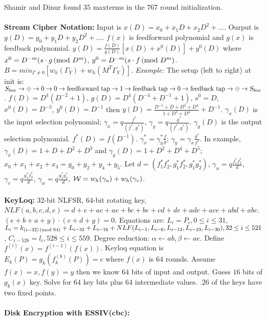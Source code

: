 Shamir and Dinur found $35$ maxterms in the $767$ round initialization.
\\
\\
{\bf Stream Cipher Notation:} 
Input is $x(D)= x_0 + x_1 D + x_2 D^2 + \ldots $.
Ourput is $y(D)= y_0 + y_1 D + y_2 D^2 + \ldots $.
$f(x)$ is feedforward polynomial and $g(x)$ is feedback polynomial.
$y(D)= {\frac {f(D)}{g(D)}} [x(D) + x^0(D)] + y^0(D)$ where
$x^0= D^{-m} (s \cdot g \thinspace \textnormal{(mod } D^m \textnormal{)}$,
$y^0= D^{-m} (s \cdot f \thinspace \textnormal{(mod } D^m \textnormal{)}$.
$B= min_{\Gamma \ne 0} [w_h(\Gamma_Y) + w_h(M^T \Gamma_Y)]$.
\emph{Example:} The setup (left to right) at init is:
$ S_{box} \rightarrow  \oplus \rightarrow
0 \rightarrow 0 \rightarrow \textnormal{feedforward tap} \rightarrow
1 \rightarrow \textnormal{feedback tap} \rightarrow 0 \rightarrow
\textnormal{feedback tap} \rightarrow \oplus \rightarrow S_{box}$.
$f(D)= D^4(D^{-2} + 1)$,
$g(D)= D^4(D^{-4}+ D^{-1} + 1)$, $s^0= D$, $x^0(D)= D^{-3}$,
$y^0(D)= D^{-1}$ then
$y(D)= {\frac {D^{-1}+D+D^2+D^4} {1+D^3+D^4}} + D^{-1}$.
$\gamma_x(D)$ is the input selection polynomial;
$\gamma_x = q {\frac {f^*} {(f^*, g^*)}}$,
$\gamma_y = q {\frac {g^*} {(f^*, g^*)}}$.
$\gamma_y(D)$ is the output selection polynomial. $f^*(D)= f(D^{-1})$.
$\gamma_x^*= \gamma_y^* {\frac {f} {g}}$;
$\gamma_y= \gamma_x {\frac {g^*} {f^*}}$.  In example, 
$\gamma_x(D)= 1 + D + D^2 + D^3$ and
$\gamma_y(D)= 1 + D^2 + D^4 + D^5$; $x_0 + x_1 + x_2 + x_3 = y_0 + y_2 + y_4 + y_5$.
Let $d= (f_1^* f_2^*, g_1^*f_2^*, g_1^* g_2^*)$,
$\gamma_u= q {\frac {f_1^* f_2^*} {d}} $,
$\gamma_v= q {\frac {g_1^* f_2^*} {d}} $,
$\gamma_w= q {\frac {g_1^* g_2^*} {d}} $, ${\cal W} = w_h(\gamma_u) + w_h(\gamma_v)$.
\\
\\
{\bf KeyLoq:} $32$-bit NLFSR, $64$-bit rotating key,
$NLF(a,b,c,d,e)= d+e+ac+ae+bc+be+cd+de+ade+ace+abd+abc$.  $(e+b+a+y) \cdot (c+d+y)=0$.
Equations are: 
$L_i= P_i, 0 \le i \le 31$,
$L_i= k_{(i-32) \thinspace \textnormal{(mod } 64 \textnormal{)}} + L_{i-32} + L_{i-16} +
NLF(L_{i-1}, L_{i-6}, L_{i-12}, L_{i-23}, L_{i-30}), 32 \le i \le 521$,
$C_{i-528}= l_i, 528 \le i \le 559$. 
Degree reduction: $\alpha \leftarrow ab, \beta \leftarrow ae$.  Define
$f^{(i)}(x)= f^{(i-1)}(f(x))$.
Keyloq equation is $E_k(P)= g_k(f_k^{(8)}(P))= c$ where $f(x)$ is $64$ rounds.
Assume $f(x)=x, f(y)= y$ then we know $64$ bits of input and output.  Guess $16$ bits
of $g_k(x)$ key.  Solve for $64$ key bits plus $64$ intermediate values.  $.26$ of the keys
have two fixed points.
\\
\\
{\bf Disk Encryption with ESSIV(cbc):} 
